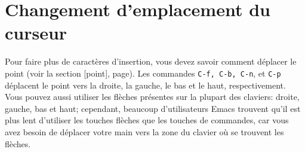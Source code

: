 \section{Changement d'emplacement du curseur}
Pour faire plus de caractères d'insertion, vous devez savoir comment
déplacer le point (voir la section [point],
page). Les commandes \texttt{C-f, C-b, C-n}, et
\texttt{C-p} déplacent le point vers la droite, la gauche, le bas et le
haut, respectivement. Vous pouvez aussi utiliser les flèches présentes
sur la plupart des claviers: droite, gauche, bas et haut; cependant,
beaucoup d'utilisateurs Emacs trouvent qu'il est plus lent d'utiliser
les touches flèches que les touches de commandes, car vous avez besoin
de déplacer votre main vers la zone du clavier où se trouvent les
flèches.\par 

